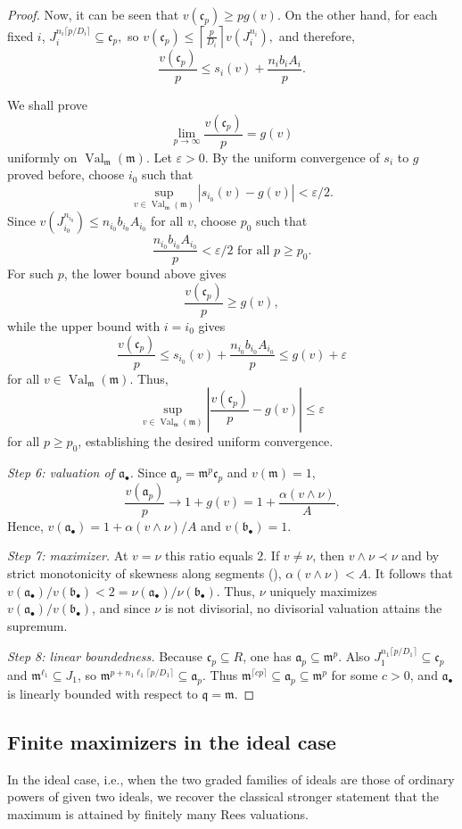 \documentclass[12pt]{amsart}
\newcommand{\m}{\mathfrak m}
\newcommand{\q}{\mathfrak q}
\renewcommand{\a}{\mathfrak{a}}
\renewcommand{\b}{\mathfrak{b}}
\newcommand{\fc}{\mathfrak{c}}
\DeclareMathOperator{\Val}{Val}
\newcommand{\abul}{{\a_\bullet}}
\newcommand{\bbul}{{\b_\bullet}}
\theoremstyle{plain}
\theoremstyle{definition}
\numberwithin{equation}{section}
\begin{document}
\begin{proof}
Now, it can be seen that $v(\fc_p)\ge pg(v)$. On the other hand, for each fixed $i$, $J_i^{n_i\lceil p/D_i\rceil}\subseteq \fc_p,$ so $v(\fc_p)\le \left\lceil \frac{p}{D_i}\right\rceil v(J_i^{n_i}),$
and therefore,
\[
\frac{v(\fc_p)}{p}\le s_i(v)+\frac{n_ib_iA_i}{p}.
\]

We shall prove 
\[
\lim_{p\to\infty}\frac{v(\fc_p)}{p}=g(v)
\]
uniformly on $\Val_{\m}(\m)$. Let $\varepsilon>0$.
By the uniform convergence of $s_i$ to $g$ proved before, choose $i_0$ such that
\[
\sup_{v\in\Val_{\m}(\m)} |s_{i_0}(v)-g(v)|<\varepsilon/2.
\]
Since $v(J_{i_0}^{n_{i_0}})\le n_{i_0}b_{i_0}A_{i_0}$ for all $v$,
choose $p_0$ such that
\[
\frac{n_{i_0}b_{i_0}A_{i_0}}{p}<\varepsilon/2 \text{ for all }p\ge p_0.
\]
For such $p$, the lower bound above gives
\[
\frac{v(\fc_p)}{p}\ge g(v),
\]
while the upper bound with $i=i_0$ gives
\[
\frac{v(\fc_p)}{p}
\le
s_{i_0}(v)+\frac{n_{i_0}b_{i_0}A_{i_0}}{p}
\le
g(v)+\varepsilon
\]
for all $v\in\Val_{\m}(\m)$.
Thus,
\[
\sup_{v\in\Val_{\m}(\m)}
\left|
\frac{v(\fc_p)}{p}-g(v)
\right|
\le\varepsilon
\]
for all $p\ge p_0$, establishing the desired uniform convergence.

\smallskip
\noindent\textit{Step 6: valuation of $\abul$.}
Since $\a_p=\m^p\fc_p$ and $v(\m)=1$,
\[
\frac{v(\a_p)}p\to1+g(v)=1+\frac{\alpha(v\wedge\nu)}{A}.
\]
Hence, $v(\abul)=1+\alpha(v\wedge\nu)/A$ and $v(\bbul)=1$.

\smallskip
\noindent\textit{Step 7: maximizer.}
At $v=\nu$ this ratio equals $2$.  
If $v\ne\nu$, then $v\wedge\nu\prec\nu$ and by strict monotonicity of
skewness along segments (\cite[Thm.~3.26]{FJ04}),
$\alpha(v\wedge\nu)<A$. It follows that $v(\abul)/v(\bbul)<2=\nu(\abul)/\nu(\bbul)$.
Thus, $\nu$ uniquely maximizes $v(\abul)/v(\bbul)$, and since $\nu$ is not
divisorial, no divisorial valuation attains the supremum.

\smallskip
\noindent\textit{Step 8: linear boundedness.}
Because $\fc_p\subseteq R$, one has $\a_p\subseteq\m^p$.  
Also $J_1^{n_1\lceil p/D_1\rceil}\subseteq\fc_p$ and
$\m^{\ell_1}\subseteq J_1$, so
$\m^{p+n_1\ell_1\lceil p/D_1\rceil}\subseteq\a_p$.  
Thus $\m^{\lceil cp\rceil}\subseteq\a_p\subseteq\m^p$ for some $c>0$, and
$\abul$ is linearly bounded with respect to $\q=\m$.
\end{proof}


\subsection{Finite maximizers in the ideal case}
In the ideal case, i.e., when the two graded families of ideals are those of ordinary powers of given two ideals, we recover the classical stronger statement that the maximum is attained by finitely many Rees valuations.
\end{document}
